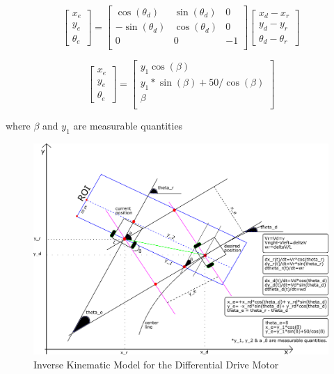 \documentclass[a4paper,12pt]{article}
\begin{document}
\begin{itemize}
\begin{appendices}
$$ 
	\begin{bmatrix} {x_e} \\ {y_e} \\ {\theta_e}  \end{bmatrix}
 	=
  	\begin{bmatrix}
   	\cos (\theta_d) & \sin (\theta_d) & 0\\
   	-\sin (\theta_d) & \cos (\theta_d) & 0\\
    0 & 0 &  -1 \\
   	\end{bmatrix}
	\begin{bmatrix} x_d-x_r \\ y_d-y_r \\ \theta_d-\theta_r \end{bmatrix}
$$


$$ 
	\begin{bmatrix} {x_e} \\ {y_e} \\ {\theta_e}  \end{bmatrix}
 	=
  	\begin{bmatrix}
   	y_1 \cos (\beta)\\
   	y_1*\sin (\beta) + 50/\cos (\beta)\\
    \beta \\
   	\end{bmatrix}
$$

where $\beta$ and $y_1$ are measurable quantities

\begin{figure}[H]
	\center
	\setlength{\unitlength}{\textwidth} 
	\includegraphics[width=1.0\unitlength]{state_3}
	\caption{\label{fig:stateFB} Inverse Kinematic Model for the Differential Drive Motor}
\end{figure}


\end{appendices}
		
\end{itemize}
\end{document}
